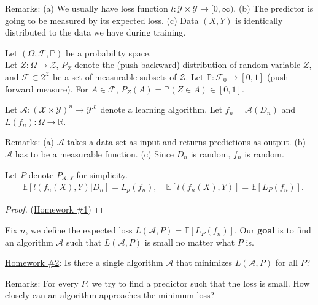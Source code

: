 \documentclass[twoside]{article}
\begin{document}
Remarks: (a) We usually have loss function $l: \mathcal{Y} \times \mathcal{Y} \rightarrow [0, \infty)$.
(b) The predictor is going to be measured by its expected loss.
(c) Data $(X,Y)$ is identically distributed to the data we have during training.

\begin{definition}
    Let $(\Omega, \mathcal{F}, \mathbb{P})$ be a probability space.\\
    Let $Z:\Omega \rightarrow \mathcal{Z}$, $P_Z$ denote the (push backward) distribution of random variable $Z$, and $\mathcal{F}\subset 2^\mathcal{Z}$ be a set of measurable subsets of $\mathcal{Z}.$
    Let $\mathbb{P}: \mathcal{F}_0 \rightarrow [0,1]$ (push forward measure). For $A\in \mathcal{F}$, $P_Z(A)=\mathbb{P}(Z\in A) \in [0,1]$.
\end{definition}
 
\begin{definition}
    Let $\mathcal{A}: (\mathcal{X}\times \mathcal{Y})^n \rightarrow \mathcal{Y}^\mathcal{X}$ denote a learning algorithm. Let $f_n=\mathcal{A}(D_n)$ and $L(f_n): \Omega \rightarrow \mathbb{R}$.
\end{definition}

Remarks:
 (a) $\mathcal{A}$ takes a data set as input and returns predictions as output.
 (b) $\mathcal{A}$ has to be a measurable function.
 (c) Since $D_n$ is random, $f_n$ is random.

\begin{lemma} Let $P$ denote $P_{X,Y}$ for simplicity.
\begin{align*}
    & \mathbb{E}[ l\left( f_n(X),Y \right) | D_n ] = L_p(f_n),\quad 
    \mathbb{E}[ l\left( f_n(X),Y \right) ] = \mathbb{E} [L_{P }(f_n)].
\end{align*}
\end{lemma}
\begin{proof}
    (\underline{Homework \#1})
\end{proof}

Fix $n$, we define the expected loss $L(\mathcal{A},P ) = \mathbb{E} [L_{P }(f_n)]$. Our {\bf goal} is to find an algorithm $\mathcal{A}$ such that $L(\mathcal{A}, P )$ is small no matter what $P$ is.

\underline{Homework \#2}: Is there a single algorithm $\mathcal{A}$ that minimizes $L(\mathcal{A},P)$ for all $P$?

Remarks: For every $P$, we try to find a predictor such that the loss is small. How closely can an algorithm approaches the minimum loss?
\end{document}
